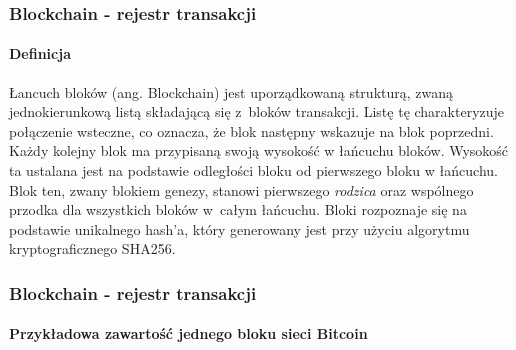 \documentclass[]{beamer}
\begin{document}
\begin{frame}
 \frametitle{Blockchain - rejestr transakcji}
 \framesubtitle{Definicja}
 \justify
  Łancuch bloków (ang. Blockchain) jest uporządkowaną strukturą, zwaną jednokierunkową listą składającą się z~bloków transakcji. Listę tę charakteryzuje połączenie wsteczne, co oznacza, że blok następny wskazuje na blok poprzedni. Każdy kolejny blok ma przypisaną swoją wysokość w łańcuchu bloków. Wysokość ta ustalana jest na podstawie odległości bloku od pierwszego bloku w łańcuchu. Blok ten, zwany blokiem genezy, stanowi pierwszego \textit{rodzica} oraz wspólnego przodka dla wszystkich bloków w~całym łańcuchu. Bloki rozpoznaje się na podstawie unikalnego hash'a, który generowany jest przy użyciu algorytmu kryptograficznego SHA256.

\end{frame}

\begin{frame}
\frametitle{Blockchain - rejestr transakcji}
\framesubtitle{Przykładowa zawartość jednego bloku sieci Bitcoin}
\begin{figure}[H]
	\begin{center}	
	\end{center}
\end{figure}
\end{frame}
\end{document}
